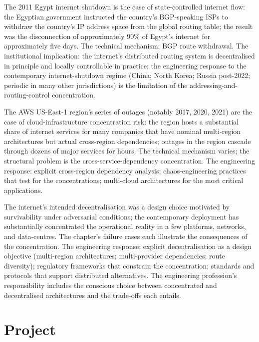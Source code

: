 The 2011 Egypt internet shutdown \cite{paper:dainotti-egypt-2011} is the case of state-controlled internet flow: the Egyptian government instructed the country's BGP-speaking ISPs to withdraw the country's IP address space from the global routing table; the result was the disconnection of approximately $90\%$ of Egypt's internet for approximately five days. The technical mechanism: BGP route withdrawal. The institutional implication: the internet's distributed routing system is decentralised in principle and locally controllable in practice; the engineering response to the contemporary internet-shutdown regime (China; North Korea; Russia post-2022; periodic in many other jurisdictions) is the limitation of the addressing-and-routing-control concentration.

The AWS US-East-1 region's series of outages \cite{web:aws-us-east-1-postmortems} (notably 2017, 2020, 2021) are the case of cloud-infrastructure concentration risk: the region hosts a substantial share of internet services for many companies that have nominal multi-region architectures but actual cross-region dependencies; outages in the region cascade through dozens of major services for hours. The technical mechanism varies; the structural problem is the cross-service-dependency concentration. The engineering response: explicit cross-region dependency analysis; chaos-engineering practices that test for the concentrations; multi-cloud architectures for the most critical applications.

\begin{principle}
The internet's intended decentralisation was a design choice motivated by survivability under adversarial conditions; the contemporary deployment has substantially concentrated the operational reality in a few platforms, networks, and data-centres. The chapter's failure cases each illustrate the consequences of the concentration. The engineering response: explicit decentralisation as a design objective (multi-region architectures; multi-provider dependencies; route diversity); regulatory frameworks that constrain the concentration; standards and protocols that support distributed alternatives. The engineering profession's responsibility includes the conscious choice between concentrated and decentralised architectures and the trade-offs each entails.
\end{principle}

\section{Project}

